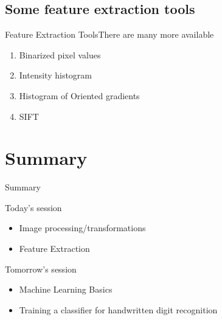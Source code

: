 \documentclass{beamer}
\begin{document}
\subsection{Some feature extraction tools}
\begin{frame}{Feature Extraction Tools}{There are many more available}
\begin{enumerate}
\item Binarized pixel values
\pause
\item Intensity histogram
\pause
\item Histogram of Oriented gradients
\pause
\item SIFT
\end{enumerate}
\end{frame}



\section*{Summary}
\begin{frame}{Summary}

\begin{block}{Today's session}
\begin{itemize}
\item Image processing/transformations
\item Feature Extraction
\end{itemize}
\end{block}

\begin{block}{Tomorrow's session}
\begin{itemize}
\item Machine Learning Basics
\item Training a classifier for handwritten digit recognition
\end{itemize}
\end{block}




\end{frame}
\end{document}
